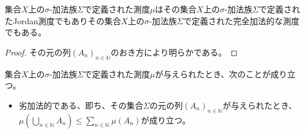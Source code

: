 \documentclass[dvipdfmx]{jsarticle}
\begin{document}
\begin{thm}\label{4.5.3.11}
集合$X$上の$\sigma$-加法族$\varSigma$で定義された測度$\mu$はその集合$X$上の$\sigma$-加法族$\varSigma$で定義されたJordan測度でもありその集合$X$上の$\sigma$-加法族$\varSigma$で定義された完全加法的な測度でもある。
\end{thm}
\begin{proof}
その元の列$\left( A_{n} \right)_{n \in \mathbb{N}}$のおき方により明らかである。
\end{proof}
\begin{thm}\label{4.5.3.12}
集合$X$上の$\sigma$-加法族$\varSigma$で定義された測度$\mu$が与えられたとき、次のことが成り立つ。
\begin{itemize}
\item
  劣加法的である、即ち、その集合$\varSigma$の元の列$\left( A_{n} \right)_{n \in \mathbb{N}}$が与えられたとき、$\mu\left( \bigcup_{n \in \mathbb{N}} A_{n} \right) \leq \sum_{n \in \mathbb{N}} {\mu\left( A_{n} \right)}$が成り立つ。
\end{itemize}
\end{thm}
\end{document}
